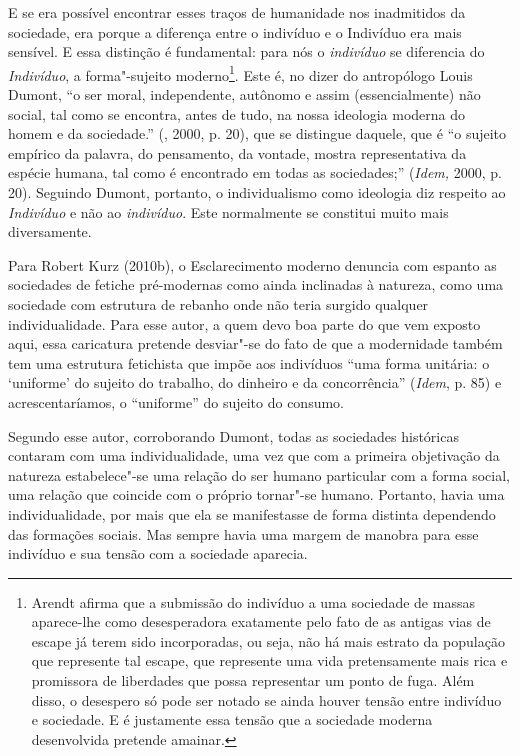 E se era possível encontrar esses traços de humanidade nos inadmitidos
da sociedade, era porque a diferença entre o indivíduo e o Indivíduo era
mais sensível. E essa distinção é fundamental: para nós o
\emph{indivíduo} se diferencia do \emph{Indivíduo}, a forma"-sujeito
moderno\footnote{Arendt afirma que a submissão do indivíduo a uma sociedade
de massas aparece-lhe como desesperadora exatamente pelo fato de as antigas
vias de escape já terem sido incorporadas, ou seja, não há mais estrato da
população que represente tal escape, que represente uma vida pretensamente
mais rica e promissora de liberdades que possa representar um ponto de fuga.
Além disso, o desespero só pode ser notado se ainda houver tensão entre
indivíduo e sociedade. E é justamente essa tensão que a sociedade moderna
desenvolvida pretende amainar.}. Este é, no dizer do antropólogo Louis Dumont, ``o ser moral,
independente, autônomo e assim (essencialmente) não social, tal como se
encontra, antes de tudo, na nossa ideologia moderna do homem e da
sociedade.'' (, 2000, p. 20), que se distingue daquele, que é ``o
sujeito empírico da palavra, do pensamento, da vontade, mostra
representativa da espécie humana, tal como é encontrado em todas as
sociedades;'' (\emph{Idem,} 2000, p. 20). Seguindo Dumont, portanto, o
individualismo como ideologia diz respeito ao \emph{Indivíduo} e não ao
\emph{indivíduo}. Este normalmente se constitui muito mais diversamente.

Para Robert Kurz (2010b), o Esclarecimento moderno denuncia com espanto
as sociedades de fetiche pré-modernas como ainda inclinadas à natureza,
como uma sociedade com estrutura de rebanho onde não teria surgido
qualquer individualidade. Para esse autor, a quem devo boa parte do que
vem exposto aqui, essa caricatura pretende desviar"-se do fato de que a
modernidade também tem uma estrutura fetichista que impõe aos indivíduos
``uma forma unitária: o `uniforme' do sujeito do trabalho, do dinheiro e
da concorrência'' (\emph{Idem}, p. 85) e acrescentaríamos, o
``uniforme'' do sujeito do consumo.

Segundo esse autor, corroborando Dumont, todas as sociedades históricas
contaram com uma individualidade, uma vez que com a primeira objetivação
da natureza estabelece"-se uma relação do ser humano particular com a
forma social, uma relação que coincide com o próprio tornar"-se humano.
Portanto, havia uma individualidade, por mais que ela se manifestasse de
forma distinta dependendo das formações sociais. Mas sempre havia uma
margem de manobra para esse indivíduo e sua tensão com a sociedade
aparecia.

